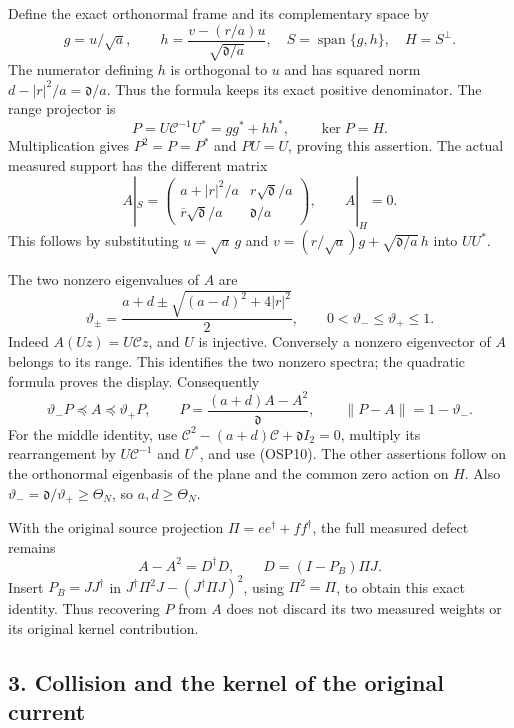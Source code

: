 \documentclass[
]{article}
\begin{document}
Define the exact orthonormal frame and its complementary space by \[
g=u/\sqrt a,\qquad
h=\frac{v-(r/a)u}{\sqrt{\mathfrak d/a}},\quad
S=\operatorname{span}\{g,h\},\quad H=S^\perp.
\tag{OSP9}
\] The numerator defining \(h\) is orthogonal to \(u\) and has squared
norm \(d-|r|^2/a=\mathfrak d/a\). Thus the formula keeps its exact
positive denominator. The range projector is \[
P=U\mathcal C^{-1}U^*=gg^*+hh^*,\qquad\ker P=H.
\tag{OSP10}
\] Multiplication gives \(P^2=P=P^*\) and \(PU=U\), proving this
assertion. The actual measured support has the different matrix \[
A|_S=\begin{pmatrix}
a+|r|^2/a&r\sqrt{\mathfrak d}/a\\
\overline r\sqrt{\mathfrak d}/a&\mathfrak d/a
\end{pmatrix},\qquad A|_H=0.
\tag{OSP11}
\] This follows by substituting \(u=\sqrt a\,g\) and
\(v=(r/\sqrt a)g+\sqrt{\mathfrak d/a}\,h\) into \(UU^*\).

The two nonzero eigenvalues of \(A\) are \[
\vartheta_\pm=\frac{a+d\pm\sqrt{(a-d)^2+4|r|^2}}2,
\qquad0<\vartheta_-\le\vartheta_+\le1.
\tag{OSP12}
\] Indeed \(A(Uz)=U\mathcal Cz\), and \(U\) is injective. Conversely a
nonzero eigenvector of \(A\) belongs to its range. This identifies the
two nonzero spectra; the quadratic formula proves the display.
Consequently \[
\vartheta_-P\preceq A\preceq\vartheta_+P,\qquad
P=\frac{(a+d)A-A^2}{\mathfrak d},\qquad
\|P-A\|=1-\vartheta_-.
\tag{OSP13}
\] For the middle identity, use
\(\mathcal C^2-(a+d)\mathcal C+\mathfrak dI_2=0\), multiply its
rearrangement by \(U\mathcal C^{-1}\) and \(U^*\), and use (OSP10). The
other assertions follow on the orthonormal eigenbasis of the plane and
the common zero action on \(H\). Also
\(\vartheta_-=\mathfrak d/\vartheta_+\ge\Theta_N\), so
\(a,d\ge\Theta_N\).

With the original source projection \(\Pi=ee^\dagger+ff^\dagger\), the
full measured defect remains \[
A-A^2=D^\dagger D,\qquad D=(I-P_B)\Pi J.
\tag{OSP14}
\] Insert \(P_B=JJ^\dagger\) in \(J^\dagger\Pi^2J-(J^\dagger\Pi J)^2\),
using \(\Pi^2=\Pi\), to obtain this exact identity. Thus recovering
\(P\) from \(A\) does not discard its two measured weights or its
original kernel contribution.

\subsection{3. Collision and the kernel of the original
current}\label{collision-and-the-kernel-of-the-original-current}
\end{document}
